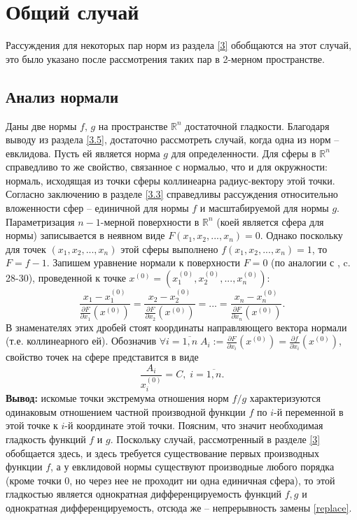 \documentclass{article}
\begin{document}
\newpage
\section{Общий случай}
Рассуждения для некоторых пар норм из раздела \ref{3} обобщаются на этот случай, это было указано после рассмотрения таких пар в 2-мерном пространстве.
\subsection{Анализ нормали}
Даны две нормы $f, \, g$ на пространстве $\mathbb{R}^n$ достаточной гладкости. Благодаря выводу из раздела \ref{3.5}, достаточно рассмотреть случай, когда одна из норм -- евклидова. Пусть ей является норма $g$ для определенности. Для сферы в $\mathbb{R}^n$ справедливо то же свойство, связанное с нормалью, что и для окружности: нормаль, исходящая из точки сферы коллинеарна радиус-вектору этой точки. Согласно заключению в разделе \ref{3.3} справедливы рассуждения относительно вложенности сфер -- единичной для нормы $f$ и масштабируемой для нормы $g$. \vspace{1mm} \newline
Параметризация $n-1$-мерной поверхности в $\mathbb{R}^n$ (коей является сфера для нормы) записывается в неявном виде $F(x_1,x_2,...,x_n) = 0$. Однако поскольку для точек $(x_1,x_2,...,x_n)$ этой сферы выполнено $f(x_1,x_2,...,x_n) = 1$, то $F = f - 1$.
Запишем уравнение нормали к поверхности $F = 0$ (по аналогии с \cite{Ignatyev}, c. 28-30), проведенной к точке $x^{(0)} = \left(x_1^{(0)},x_2^{(0)},...,x_n^{(0)}\right)$:
$$ \frac{x_1-x_1^{(0)}}{\frac{\partial F}{\partial x_1}\left(x^{(0)}\right)} = \frac{x_2-x_2^{(0)}}{\frac{\partial F}{\partial x_2}\left(x^{(0)}\right)} = ... = \frac{x_n-x_n^{(0)}}{\frac{\partial F}{\partial x_n}\left(x^{(0)}\right)}. $$
В знаменателях этих дробей стоят координаты направляющего вектора нормали (т.е. коллинеарного ей). Обозначив $\forall{i = \overline{1,n}} \; A_i := \frac{\partial F}{\partial x_i}\left(x^{(0)}\right) = \frac{\partial f}{\partial x_i}\left(x^{(0)}\right)$, свойство точек на сфере представится в виде
$$ \frac{A_i}{x_i^{(0)}} = C, \; i = \overline{1,n}. $$
\vspace{2mm}
\newline
\textbf{Вывод:} искомые точки экстремума отношения норм $f/g$ характеризуются одинаковым отношением частной производной функции $f$ по $i$-й переменной в этой точке к $i$-й координате этой точки.
\vspace{2mm}
\newline
Поясним, что значит необходимая гладкость функций $f$ и $g$. Поскольку случай, рассмотренный в разделе \ref{3} обобщается здесь, и здесь требуется существование первых производных функции $f$, а у евклидовой нормы существуют производные любого порядка (кроме точки 0, но через нее не проходит ни одна единичная сфера), то этой гладкостью является однократная дифференцируемость функций $f,g$ и однократная дифференцируемость, отсюда же -- непрерывность замены \eqref{replace}.
\end{document}

